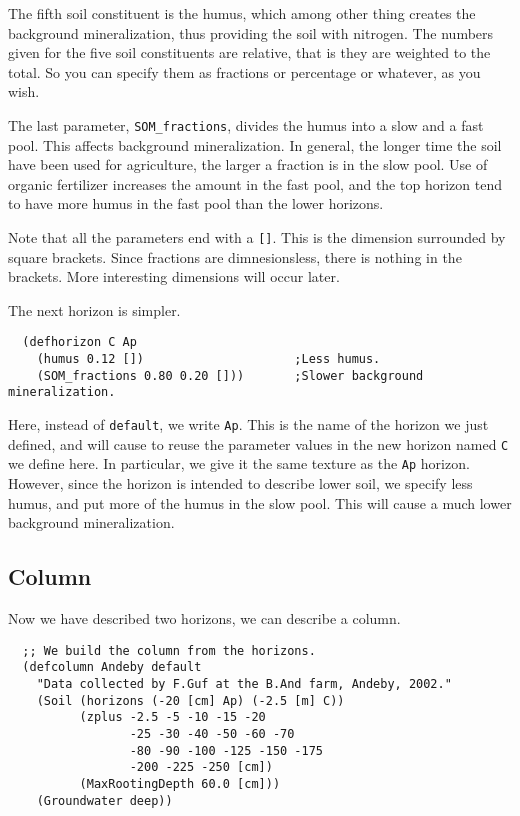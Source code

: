 \documentclass[a4paper,11pt]{article}
\begin{document}
The fifth soil constituent is the humus, which among other thing
creates the background mineralization, thus providing the soil with
nitrogen.  The numbers given for the five soil constituents are
relative, that is they are weighted to the total.  So you can specify
them as fractions or percentage or whatever, as you wish.

The last parameter, \texttt{SOM\_fractions}, divides the humus into a
slow and a fast pool.  This affects background mineralization.  In
general, the longer time the soil have been used for agriculture, the
larger a fraction is in the slow pool.  Use of organic fertilizer
increases the amount in the fast pool, and the top horizon tend to have
more humus in the fast pool than the lower horizons.

Note that all the parameters end with a \verb|[]|.  This is the
dimension surrounded by square brackets.  Since fractions are
dimnesionsless, there is nothing in the brackets.  More interesting
dimensions will occur later.

The next horizon is simpler.

\begin{verbatim}
  (defhorizon C Ap
    (humus 0.12 [])                     ;Less humus.
    (SOM_fractions 0.80 0.20 []))       ;Slower background mineralization.
\end{verbatim}

Here, instead of \texttt{default}, we write \texttt{Ap}.  This is the
name of the horizon we just defined, and will cause \daisy{} to reuse
the parameter values in the new horizon named \texttt{C} we
define here.  In particular, we give it the same texture as the
\texttt{Ap} horizon.  However, since the horizon is intended to
describe lower soil, we specify less humus, and put more of the humus
in the slow pool.  This will cause a much lower background
mineralization.

\subsection{Column}
\label{ex:column}

Now we have described two horizons, we can describe a column.

\begin{verbatim}
  ;; We build the column from the horizons.
  (defcolumn Andeby default
    "Data collected by F.Guf at the B.And farm, Andeby, 2002."
    (Soil (horizons (-20 [cm] Ap) (-2.5 [m] C))
          (zplus -2.5 -5 -10 -15 -20
                 -25 -30 -40 -50 -60 -70
                 -80 -90 -100 -125 -150 -175
                 -200 -225 -250 [cm])
          (MaxRootingDepth 60.0 [cm]))
    (Groundwater deep))
\end{verbatim}
\end{document}
